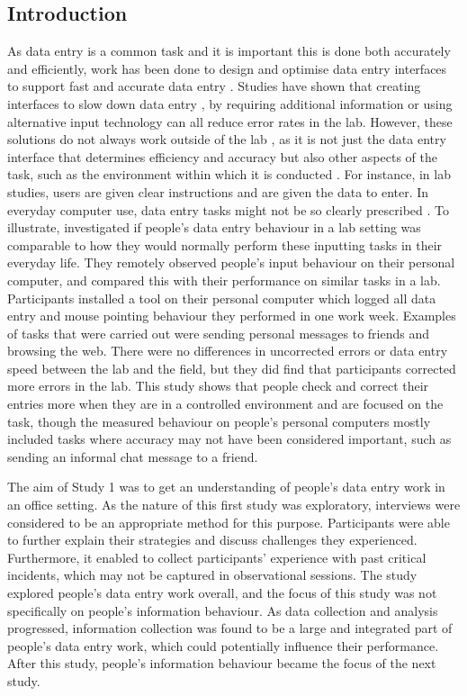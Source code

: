 \subsection{Introduction}
As data entry is a common task and it is important this is done both accurately and efficiently, work has been done to design and optimise data entry interfaces to support fast and accurate data entry \citep[e.g.][]{Oladimeji2013, Vertanen2015, Wiseman2013a}. Studies have shown that creating interfaces to slow down data entry \citep{Gould2016b}, by requiring additional information \citep{Wiseman2013a} or using alternative input technology \citep{Oladimeji2011} can all reduce error rates in the lab. However, these solutions do not always work outside of the lab \citep[e.g.][]{Gould2016b}, as it is not just the data entry interface that determines efficiency and accuracy but also other aspects of the task, such as the environment within which it is conducted \citep{Payne2013, Randall2014}. For instance, in lab studies, users are given clear instructions and are given the data to enter. In everyday computer use, data entry tasks might not be so clearly prescribed \citep{Evans2012}. To illustrate, \citet{Evans2012} investigated if people's data entry behaviour in a lab setting was comparable to how they would normally perform these inputting tasks in their everyday life. They remotely observed people's input behaviour on their personal computer, and compared this with their performance on similar tasks in a lab. Participants installed a tool on their personal computer which logged all data entry and mouse pointing behaviour they performed in one work week. Examples of tasks that were carried out were sending personal messages to friends and browsing the web. There were no differences in uncorrected errors or data entry speed between the lab and the field, but they did find that participants corrected more errors in the lab. This study shows that people check and correct their entries more when they are in a controlled environment and are focused on the task, though the measured behaviour on people's personal computers mostly included tasks where accuracy may not have been considered important, such as sending an informal chat message to a friend. 

The aim of Study 1 was to get an understanding of people's data entry work in an office setting. As the nature of this first study was exploratory, interviews were considered to be an appropriate method for this purpose. Participants were able to further explain their strategies and discuss challenges they experienced. Furthermore, it enabled to collect participants' experience with past critical incidents, which may not be captured in observational sessions. The study explored people's data entry work overall, and the focus of this study was not specifically on people's information behaviour. As data collection and analysis progressed, information collection was found to be a large and integrated part of people's data entry work, which could potentially influence their performance. After this study, people's information behaviour became the focus of the next study.

